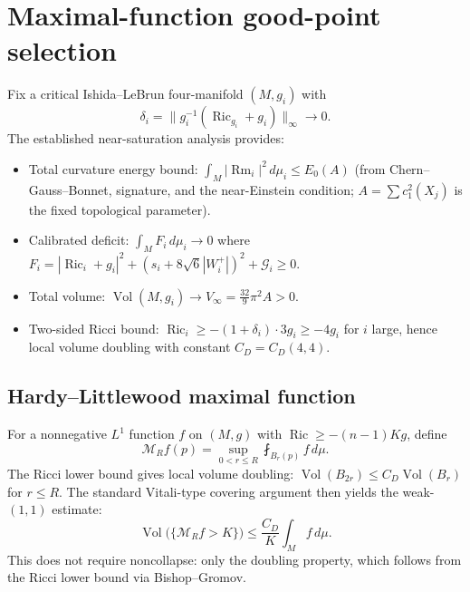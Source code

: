 %

\section{Maximal-function good-point selection}

Fix a critical Ishida--LeBrun four-manifold $(M,g_i)$ with
\[
\delta_i = \|g_i^{-1}(\operatorname{Ric}_{g_i}+g_i)\|_\infty \to 0.
\]
The established near-saturation analysis provides:
\begin{itemize}
\item Total curvature energy bound:
$\int_M |\operatorname{Rm}_i|^2\,d\mu_i \le E_0(A)$
(from Chern--Gauss--Bonnet, signature, and the near-Einstein condition;
$A=\sum c_1^2(X_j)$ is the fixed topological parameter).
\item Calibrated deficit:
$\int_M F_i\,d\mu_i \to 0$
where $F_i = |\operatorname{Ric}_i+g_i|^2 + (s_i+8\sqrt6|W_i^+|)^2 + \mathcal{G}_i \ge 0$.
\item Total volume: $\operatorname{Vol}(M,g_i) \to V_\infty = \frac{32}{9}\pi^2 A > 0$.
\item Two-sided Ricci bound: $\operatorname{Ric}_i \ge -(1+\delta_i)\cdot 3 g_i \ge -4g_i$
for $i$ large, hence local volume doubling with constant $C_D = C_D(4,4)$.
\end{itemize}

\subsection{Hardy--Littlewood maximal function}
For a nonnegative $L^1$ function $f$ on $(M,g)$ with $\operatorname{Ric}\ge -(n-1)Kg$,
define
\[
\mathcal{M}_R f(p) = \sup_{0 < r \le R} \fint_{B_r(p)} f\,d\mu.
\]
The Ricci lower bound gives local volume doubling:
$\operatorname{Vol}(B_{2r}) \le C_D\operatorname{Vol}(B_r)$ for $r \le R$.
The standard Vitali-type covering argument then yields the weak-$(1,1)$ estimate:
\[
\operatorname{Vol}\bigl(\{\mathcal{M}_R f > K\}\bigr)
\le \frac{C_D}{K}\int_M f\,d\mu.
\]
This does not require noncollapse: only the doubling property, which follows from the
Ricci lower bound via Bishop--Gromov.


